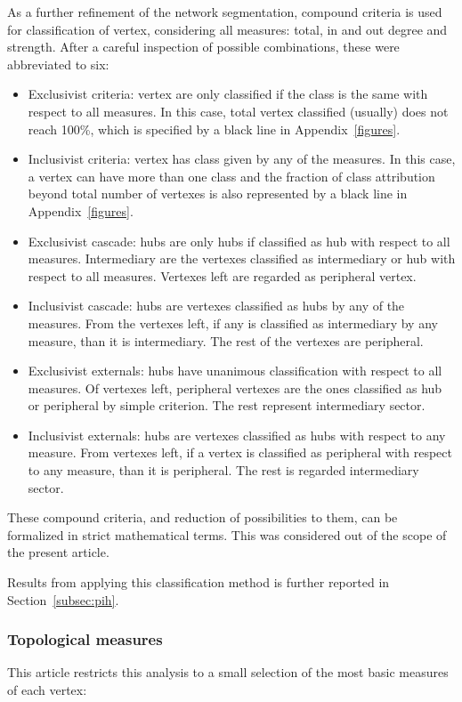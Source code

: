 \documentclass[%
 aip,
 jmp,%
 amsmath,amssymb,
 reprint,%
]{revtex4-1}
\begin{document}
As a further refinement of the network segmentation, compound criteria is used for classification of vertex, considering all measures: total, in and out degree and strength. After a careful inspection of possible combinations, these were abbreviated to six:

\begin{itemize}
    \item Exclusivist criteria: vertex are only classified if the class is the same with respect to all measures. In this case, total vertex classified (usually) does not reach 100\%, which is specified by a black line in Appendix~\ref{figures}.
    \item Inclusivist criteria: vertex has class given by any of the measures. In this case, a vertex can have more than one class and the fraction of class attribution beyond total number of vertexes is also represented by a black line in Appendix~\ref{figures}.
    \item Exclusivist cascade: hubs are only hubs if classified as hub with respect to all measures. Intermediary are the vertexes classified as intermediary or hub with respect to all measures. Vertexes left are regarded as peripheral vertex.
    \item Inclusivist cascade: hubs are vertexes classified as hubs by any of the measures. From the vertexes left, if any is classified as intermediary by any measure, than it is intermediary. The rest of the vertexes are peripheral.
    \item Exclusivist externals: hubs have unanimous classification with respect to all measures. Of vertexes left, peripheral vertexes are the ones classified as hub or peripheral by simple criterion. The rest represent intermediary sector.
    \item Inclusivist externals: hubs are vertexes classified as hubs with respect to any measure. From vertexes left, if a vertex is classified as peripheral with respect to any measure, than it is peripheral. The rest is regarded intermediary sector.
\end{itemize}

These compound criteria, and reduction of possibilities to them, can be formalized in strict mathematical terms. This was considered out of the scope of the present article. 

Results from applying this classification method is further reported in Section~\ref{subsec:pih}.

        \subsubsection{Topological measures}\label{measures}
This article
restricts this analysis to a small selection of the most basic
measures of each vertex:
\end{document}
